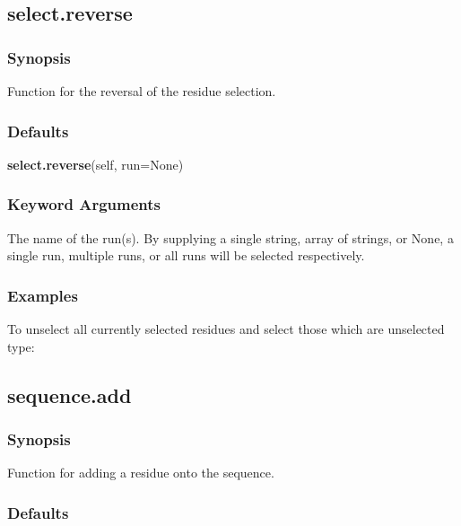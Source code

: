 \subsection{select.reverse}


\subsubsection{Synopsis}

Function for the reversal of the residue selection.



\subsubsection{Defaults}

\textsf{\textbf{select.reverse}(self, run=None)}


\subsubsection{Keyword Arguments}

  The name of the run(s).  By supplying a single string, array of strings, or None, a single run, multiple runs, or all runs will be selected respectively. 




\subsubsection{Examples}

To unselect all currently selected residues and select those which are unselected type:





\newpage

\subsection{sequence.add}


\subsubsection{Synopsis}

Function for adding a residue onto the sequence.



\subsubsection{Defaults}

